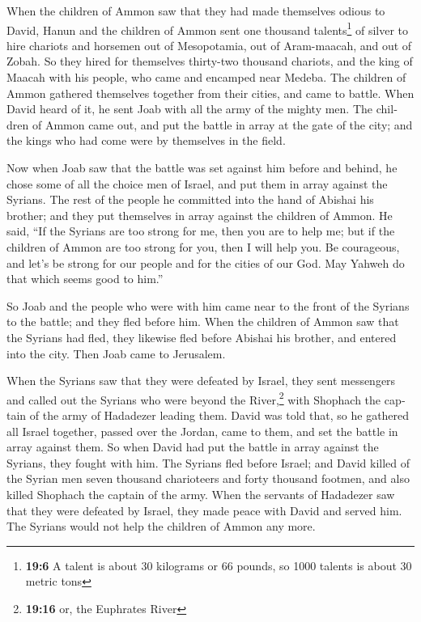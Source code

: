 \begin{paracol}{2}
\begin{otherlanguage}{english}
 When the children of Ammon saw that they had made
themselves odious to David, Hanun and the children of Ammon sent one
thousand talents\footnote{\textbf{19:6} A talent is about 30 kilograms
  or 66 pounds, so 1000 talents is about 30 metric tons} of silver to
hire chariots and horsemen out of Mesopotamia, out of Aram-maacah, and
out of Zobah.  So they hired for themselves thirty-two
thousand chariots, and the king of Maacah with his people, who came and
encamped near Medeba. The children of Ammon gathered themselves together
from their cities, and came to battle.  When David heard
of it, he sent Joab with all the army of the mighty men. 
The children of Ammon came out, and put the battle in array at the gate
of the city; and the kings who had come were by themselves in the field.

 Now when Joab saw that the battle was set against him
before and behind, he chose some of all the choice men of Israel, and
put them in array against the Syrians.  The rest of the
people he committed into the hand of Abishai his brother; and they put
themselves in array against the children of Ammon.  He
said, ``If the Syrians are too strong for me, then you are to help me;
but if the children of Ammon are too strong for you, then I will help
you.  Be courageous, and let's be strong for our people
and for the cities of our God. May Yahweh do that which seems good to
him.''

 So Joab and the people who were with him came near to
the front of the Syrians to the battle; and they fled before him.
 When the children of Ammon saw that the Syrians had
fled, they likewise fled before Abishai his brother, and entered into
the city. Then Joab came to Jerusalem.

 When the Syrians saw that they were defeated by Israel,
they sent messengers and called out the Syrians who were beyond the
River,\footnote{\textbf{19:16} or, the Euphrates River} with Shophach
the captain of the army of Hadadezer leading them.  David
was told that, so he gathered all Israel together, passed over the
Jordan, came to them, and set the battle in array against them. So when
David had put the battle in array against the Syrians, they fought with
him.  The Syrians fled before Israel; and David killed of
the Syrian men seven thousand charioteers and forty thousand footmen,
and also killed Shophach the captain of the army.  When
the servants of Hadadezer saw that they were defeated by Israel, they
made peace with David and served him. The Syrians would not help the
children of Ammon any more.


\end{otherlanguage}
\end{paracol}
